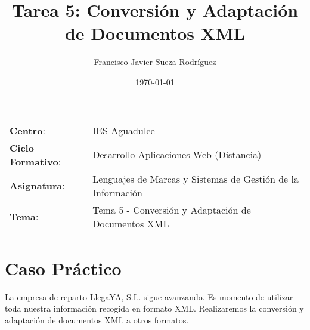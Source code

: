 


\title{
\vspace{10ex}
\normalfont \normalsize
\Huge \textbf{Tarea 5: Conversión y Adaptación de Documentos XML}
}
\author{Francisco Javier Sueza Rodríguez}
\date{\normalsize\today}



\maketitle

\thispagestyle{empty}

\vspace{62ex}

\begin{center}
    \begin{tabular}{l l}
        \textbf{Centro}: & IES Aguadulce \\
        \textbf{Ciclo Formativo}: & Desarrollo Aplicaciones Web (Distancia)\\
        \textbf{Asignatura}: & Lenguajes de Marcas y Sistemas de Gestión de la Información\\
        \textbf{Tema}: & Tema 5 - Conversión y Adaptación de Documentos XML\\
    \end{tabular}
\end{center}

\newpage





\section{Caso Práctico}
La empresa de reparto LlegaYA, S.L. sigue avanzando. Es momento de utilizar toda nuestra información recogida en formato XML. Realizaremos la conversión y adaptación de documentos XML a otros formatos.

